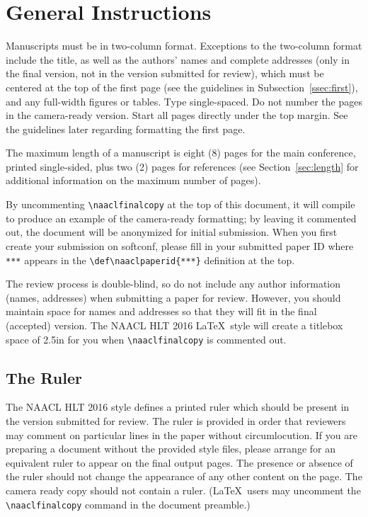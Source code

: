 \documentclass{article}
\begin{document}
\section{General Instructions}

Manuscripts must be in two-column format.  Exceptions to the
two-column format include the title, as well as the 
authors' names and complete
addresses (only in the final version, not in the version submitted for review), 
which must be centered at the top of the first page (see
the guidelines in Subsection~\ref{ssec:first}), and any full-width
figures or tables.  Type single-spaced.  Do not number the pages 
in the camera-ready version.
Start all pages directly under the top margin.  See the guidelines
later regarding formatting the first page.

The maximum length of a manuscript is eight (8) pages for the main
conference, printed single-sided, plus two (2) pages for references
(see Section~\ref{sec:length} for additional information on the
maximum number of pages). 

By uncommenting {\small\verb|\naaclfinalcopy|} at the top of this 
 document, it will compile to produce an example of the camera-ready formatting; by leaving it commented out, the document will be anonymized for initial submission.  When you first create your submission on softconf, please fill in your submitted paper ID where {\small\verb|***|} appears in the {\small\verb|\def\naaclpaperid{***}|} definition at the top.

The review process is double-blind, so do not include any author information (names, addresses) when submitting a paper for review.  
However, you should maintain space for names and addresses so that they will fit in the final (accepted) version.  The NAACL HLT 2016 \LaTeX\ style will create a titlebox space of 2.5in for you when {\small\verb|\naaclfinalcopy|} is commented out.  

\subsection{The Ruler}
The NAACL HLT 2016 style defines a printed ruler which should be present in the
version submitted for review.  The ruler is provided in order that
reviewers may comment on particular lines in the paper without
circumlocution.  If you are preparing a document without the provided
style files, please arrange for an equivalent ruler to
appear on the final output pages.  The presence or absence of the ruler
should not change the appearance of any other content on the page.  The
camera ready copy should not contain a ruler. (\LaTeX\ users may uncomment
the {\small\verb|\naaclfinalcopy|} command in the document preamble.)  
\end{document}
